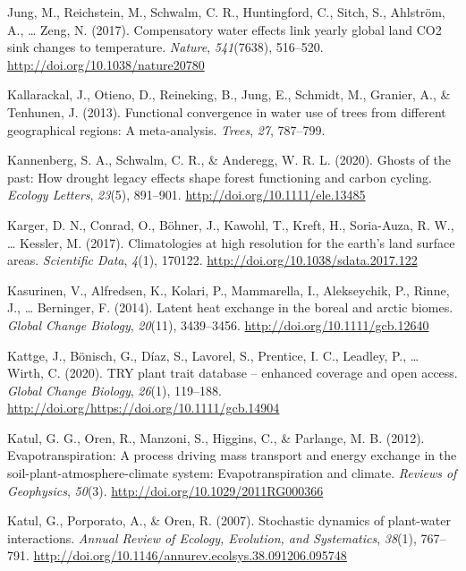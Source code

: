\documentclass[11pt,twoside]{reedthesis}
\begin{document}
\hypertarget{ref-jung_compensatory_2017}{}
Jung, M., Reichstein, M., Schwalm, C. R., Huntingford, C., Sitch, S.,
Ahlström, A., \ldots{} Zeng, N. (2017). Compensatory water effects link
yearly global land CO2 sink changes to temperature. \emph{Nature},
\emph{541}(7638), 516--520. \url{http://doi.org/10.1038/nature20780}

\hypertarget{ref-Kallarackal2013}{}
Kallarackal, J., Otieno, D., Reineking, B., Jung, E., Schmidt, M.,
Granier, A., \& Tenhunen, J. (2013). Functional convergence in water use
of trees from different geographical regions: A meta-analysis.
\emph{Trees}, \emph{27}, 787--799.

\hypertarget{ref-kannenberg_ghosts_2020}{}
Kannenberg, S. A., Schwalm, C. R., \& Anderegg, W. R. L. (2020). Ghosts
of the past: How drought legacy effects shape forest functioning and
carbon cycling. \emph{Ecology Letters}, \emph{23}(5), 891--901.
\url{http://doi.org/10.1111/ele.13485}

\hypertarget{ref-karger_climatologies_2017}{}
Karger, D. N., Conrad, O., Böhner, J., Kawohl, T., Kreft, H.,
Soria-Auza, R. W., \ldots{} Kessler, M. (2017). Climatologies at high
resolution for the earth's land surface areas. \emph{Scientific Data},
\emph{4}(1), 170122. \url{http://doi.org/10.1038/sdata.2017.122}

\hypertarget{ref-kasurinen_latent_2014}{}
Kasurinen, V., Alfredsen, K., Kolari, P., Mammarella, I., Alekseychik,
P., Rinne, J., \ldots{} Berninger, F. (2014). Latent heat exchange in
the boreal and arctic biomes. \emph{Global Change Biology},
\emph{20}(11), 3439--3456. \url{http://doi.org/10.1111/gcb.12640}

\hypertarget{ref-Kattge2020}{}
Kattge, J., Bönisch, G., Díaz, S., Lavorel, S., Prentice, I. C.,
Leadley, P., \ldots{} Wirth, C. (2020). TRY plant trait database --
enhanced coverage and open access. \emph{Global Change Biology},
\emph{26}(1), 119--188.
\url{http://doi.org/https://doi.org/10.1111/gcb.14904}

\hypertarget{ref-katul_evapotranspiration_2012}{}
Katul, G. G., Oren, R., Manzoni, S., Higgins, C., \& Parlange, M. B.
(2012). Evapotranspiration: A process driving mass transport and energy
exchange in the soil-plant-atmosphere-climate system: Evapotranspiration
and climate. \emph{Reviews of Geophysics}, \emph{50}(3).
\url{http://doi.org/10.1029/2011RG000366}

\hypertarget{ref-Katul2007}{}
Katul, G., Porporato, A., \& Oren, R. (2007). Stochastic dynamics of
plant-water interactions. \emph{Annual Review of Ecology, Evolution, and
Systematics}, \emph{38}(1), 767--791.
\url{http://doi.org/10.1146/annurev.ecolsys.38.091206.095748}
\end{document}
